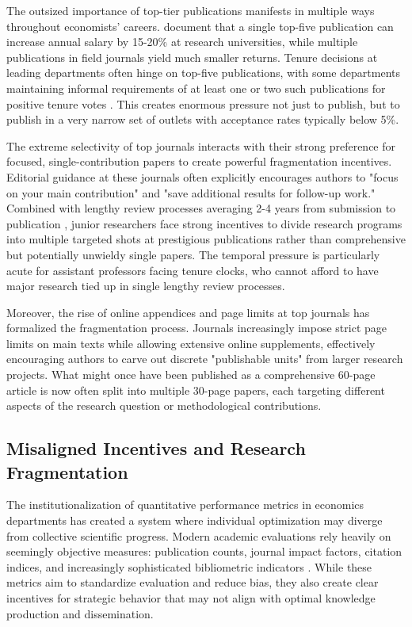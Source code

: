 \documentclass[12pt]{article}
\begin{document}
The outsized importance of top-tier publications manifests in multiple ways throughout economists' careers. \citet{johnson2019incentives} document that a single top-five publication can increase annual salary by 15-20\% at research universities, while multiple publications in field journals yield much smaller returns. Tenure decisions at leading departments often hinge on top-five publications, with some departments maintaining informal requirements of at least one or two such publications for positive tenure votes \citep{anderson2021tenure}. This creates enormous pressure not just to publish, but to publish in a very narrow set of outlets with acceptance rates typically below 5\%.

The extreme selectivity of top journals interacts with their strong preference for focused, single-contribution papers to create powerful fragmentation incentives. Editorial guidance at these journals often explicitly encourages authors to "focus on your main contribution" and "save additional results for follow-up work." Combined with lengthy review processes averaging 2-4 years from submission to publication \citep{ellison2002evolving}, junior researchers face strong incentives to divide research programs into multiple targeted shots at prestigious publications rather than comprehensive but potentially unwieldy single papers. The temporal pressure is particularly acute for assistant professors facing tenure clocks, who cannot afford to have major research tied up in single lengthy review processes.

Moreover, the rise of online appendices and page limits at top journals has formalized the fragmentation process. Journals increasingly impose strict page limits on main texts while allowing extensive online supplements, effectively encouraging authors to carve out discrete "publishable units" from larger research projects. What might once have been published as a comprehensive 60-page article is now often split into multiple 30-page papers, each targeting different aspects of the research question or methodological contributions.

\subsection{Misaligned Incentives and Research Fragmentation}

The institutionalization of quantitative performance metrics in economics departments has created a system where individual optimization may diverge from collective scientific progress. Modern academic evaluations rely heavily on seemingly objective measures: publication counts, journal impact factors, citation indices, and increasingly sophisticated bibliometric indicators \citep{gibson2014merit}. While these metrics aim to standardize evaluation and reduce bias, they also create clear incentives for strategic behavior that may not align with optimal knowledge production and dissemination.
\end{document}
